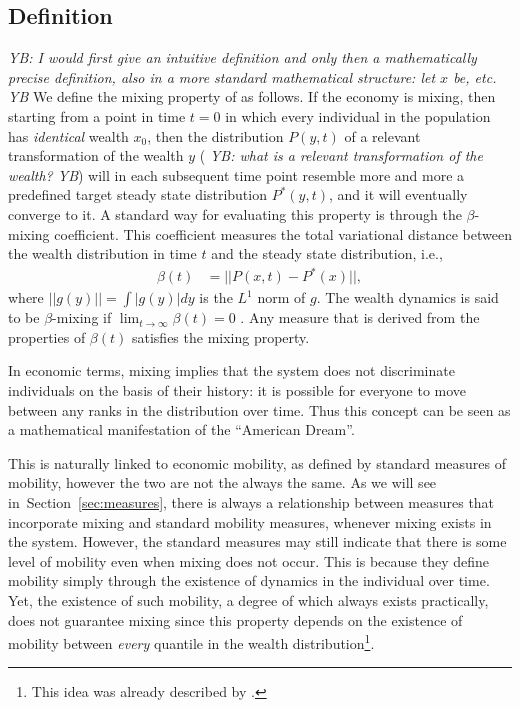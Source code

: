 \documentclass[11pt]{article}
\newcommand{\red}[1]{{\color{red} #1}}
\newcommand{\blue}[1]{{\color{blue} #1}}
\newcommand{\Sref}[1]{Section~\ref{sec:#1}}
\newcommand{\YB}[1]{\blue{{\it YB: #1 YB}}}
\numberwithin{equation}{section}
\begin{document}
\subsection{Definition}
\YB{I would first give an intuitive definition and only then a mathematically precise definition, also in a more standard mathematical structure: let $x$ be, etc.}
We define the mixing property of as follows. If the economy is mixing, then starting from a point in time $t = 0$ in which every individual in the population has \textit{identical} wealth $x_0$, then the distribution $P(y,t)$ of a relevant transformation of the wealth $y$ (\YB{what is a relevant transformation of the wealth?}) will in each subsequent time point resemble more and more a predefined target steady state distribution $P^*(y,t)$, and it will eventually converge to it. A standard way for evaluating this property is through the $\beta$-mixing coefficient. This coefficient measures the total variational distance between the wealth distribution in time $t$ and the steady state distribution, i.e.,
\begin{align*}
    \beta(t) &= || P(x,t) - P^*(x) ||,
\end{align*}
where $||g(y)|| = \int |g(y)| dy$ is the $L^1$ norm of $g$. The wealth dynamics is said to be $\beta$-mixing if $\lim_{t \to\infty} \beta(t) = 0$ \citep{drees2000weighted}. Any measure that is derived from the properties of $\beta(t)$ satisfies the mixing property.

In economic terms, mixing implies that the system does not discriminate individuals on the basis of their history: it is possible for everyone to move between any ranks in the distribution over time. Thus this concept can be seen as a mathematical manifestation of the ``American Dream''. 

This is naturally linked to economic mobility, as defined by standard measures of mobility, however the two are not the always the same. As we will see in~\Sref{measures}, there is always a relationship between measures that incorporate mixing and standard mobility measures, whenever mixing exists in the system. However, the standard measures may still indicate that there is some level of mobility even when mixing does not occur. \red{This is because they define mobility simply through the existence of dynamics in the individual over time}. Yet, the existence of such mobility, a degree of which always exists practically, does not guarantee mixing since this property depends on the existence of mobility between \textit{every} quantile in the wealth distribution\footnote{This idea was already described by \citet{Mcfarland1970}.}.
 
\end{document}
